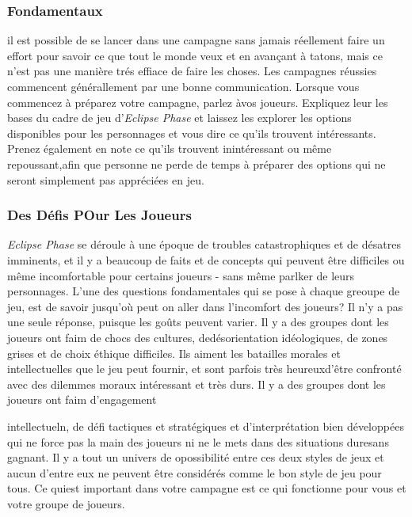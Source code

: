 \subsubsection{Fondamentaux} 

il est possible de se lancer dans une campagne sans jamais réellement faire un effort pour savoir ce que tout le monde veux et en avançant à tatons, mais ce n'est pas une manière trés effiace de faire les choses. Les campagnes réussies commencent générallement par une bonne communication. Lorsque vous commencez à préparez votre campagne, parlez àvos joueurs. Expliquez leur les bases du cadre de jeu d'\textit{Eclipse Phase} et laissez les explorer les options disponibles pour les personnages et vous dire ce qu'ils trouvent intéressants. Prenez également en note ce qu'ils trouvent inintéressant ou même repoussant,afin que personne ne perde de temps à préparer des options qui ne seront simplement pas appréciées en jeu. 

\subsubsection{Des Défis POur Les Joueurs} 

\textit{Eclipse Phase} se déroule à une époque de troubles catastrophiques et de désatres imminents, et il y a beaucoup de faits et de concepts qui peuvent être difficiles ou même incomfortable pour certains joueurs - sans même parlker de leurs personnages. L'une des questions fondamentales qui se pose à chaque greoupe de jeu, est de savoir jusqu'où peut on aller dans l'incomfort des joueurs? Il n'y a pas une seule réponse, puisque les goûts peuvent varier. Il y a des groupes dont les joueurs ont faim de chocs des cultures, dedésorientation idéologiques, de zones grises et de choix éthique difficiles. Ils aiment les batailles morales et intellectuelles que le jeu peut fournir, et sont parfois très heureuxd'être confronté avec des dilemmes moraux intéressant et très durs. Il y a des groupes dont les joueurs ont faim d'engagement 

intellectueln, de défi tactiques et stratégiques et d'interprétation bien développées qui ne force pas la main des joueurs ni ne le mets dans des situations duresans gagnant. Il y a tout un univers de opossibilité entre ces deux styles de jeux et aucun d'entre eux ne peuvent être considérés comme le bon style de jeu pour tous. Ce quiest important dans votre campagne est ce qui fonctionne pour vous et votre groupe de joueurs. 


